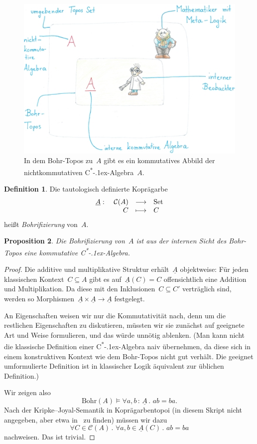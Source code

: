 \documentclass[a4paper,ngerman,12pt]{scrartcl}
\theoremstyle{definition}
\newtheorem{defn}{Definition}[section]
\theoremstyle{plain}
\newtheorem{prop}[defn]{Proposition}
\theoremstyle{remark}
\newcommand{\C}{\mathcal{C}}
\newcommand{\Bohr}{\mathrm{Bohr}}
\newcommand{\ul}[1]{\underline{#1}}
\newcommand{\csalgebra}{C\textsuperscript{*}\kern-.1ex-Algebra}
\newcommand{\Set}{\mathrm{Set}}
\renewcommand{\_}{\mathpunct{.}\,}
\newcommand{\?}{\,{:}\,}
\begin{document}
\begin{figure}
  \centering
  \includegraphics[scale=3]{bohr-topos-klein}
  \caption{\label{fig:bohr-topos}In dem Bohr-Topos zu~$A$ gibt es ein kommutatives
  Abbild der nichtkommutativen \csalgebra~$A$.}
\end{figure}

\begin{defn}Die tautologisch definierte Koprägarbe
\[ \begin{array}{@{}rrcl@{}}
  \ul{A}:\ & \C(A) &\longrightarrow& \Set \\
  & C &\longmapsto& C
\end{array} \]
heißt \emph{Bohrifizierung} von~$A$.\end{defn}
\begin{prop}Die Bohrifizierung von~$A$
ist aus der internen Sicht des Bohr-Topos eine \emph{kommutative} \csalgebra.
\end{prop}
\begin{proof}Die additive und multiplikative Struktur erhält~$\ul{A}$
objektweise: Für jeden klassischen Kontext~$C \subseteq A$ gibt es
auf~$\ul{A}(C) = C$ offensichtlich eine Addition und Multiplikation. Da diese
mit den Inklusionen~$C \subseteq C'$ verträglich sind, werden so
Morphismen~$\ul{A} \times \ul{A} \to \ul{A}$ festgelegt.

An Eigenschaften weisen wir nur die Kommutativität nach, denn um die restlichen
Eigenschaften zu diskutieren, müssten wir sie zunächst auf geeignete Art und
Weise formulieren, und das würde unnötig ablenken. (Man kann nicht die
klassische Definition einer \csalgebra{} naiv übernehmen, da diese sich in
einem konstruktiven Kontext wie dem Bohr-Topos nicht gut verhält. Die geeignet
umformulierte Definition ist in klassischer Logik äquivalent zur üblichen
Definition.)

Wir zeigen also
\[ \Bohr(A) \models \forall a,b\?\ul{A}\_ a b = b a. \]
Nach der Kripke--Joyal-Semantik in Koprägarbentopoi (in diesem Skript nicht
angegeben, aber etwa in~\cite[Seite~100f.]{streicher:ctcl} zu finden) müssen wir dazu
\[ \forall C \in \C(A)\_ \forall a,b \in \ul{A}(C)\_ a b = b a \]
nachweisen. Das ist trivial.\end{proof}
\end{document}
